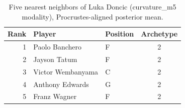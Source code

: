 \begin{table}[htbp]
  \centering\small
  \begin{tabular}{rllc}
    \toprule
    Rank & Player & Position & Archetype \\
    \midrule
    1 & Paolo Banchero & F & 2 \\
    2 & Jayson Tatum & F & 2 \\
    3 & Victor Wembanyama & C & 2 \\
    4 & Anthony Edwards & G & 2 \\
    5 & Franz Wagner & F & 2 \\
    \bottomrule
  \end{tabular}
  \caption{Five nearest neighbors of Luka Doncic (curvature_m5 modality), Procrustes-aligned posterior mean.}
  \label{tab:Luka_Doncic_neighbors_curvature_m5}
\end{table}

